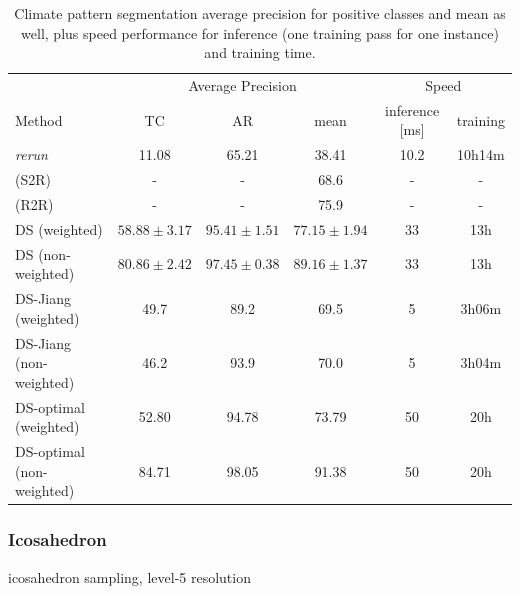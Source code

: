 \documentclass{article} %
\begin{document}
\begin{table}
\begin{tabular}{l|c c c c c}
        \multicolumn{1}{l}{} & \multicolumn{3}{c}{Average Precision} & \multicolumn{2}{c}{Speed}\\
        \cmidrule(lr){2-4}\cmidrule(lr){5-6}
        \multicolumn{1}{l}{Method} & TC & AR & mean & inference [ms] & training \\ \hline
        \cite{jiang_spherical_2019} \emph{rerun} & 11.08 & 65.21 & 38.41 & 10.2 & 10h14m\\
        \cite{cohen_gauge_2019} (S2R) & - & -& 68.6 & - & - \\
        \cite{cohen_gauge_2019} (R2R) & - & -& 75.9 & - & -\\ \hline
        DS (weighted) & $58.88\pm 3.17$ & $95.41\pm 1.51$ & $77.15\pm 1.94$ & 33 & 13h \\
        DS (non-weighted) & $80.86\pm 2.42$ & $97.45\pm 0.38$ & $89.16\pm 1.37$ & 33 & 13h \\ \hline
        DS-Jiang (weighted) & 49.7 & 89.2 & 69.5 & 5 & 3h06m\\
        DS-Jiang (non-weighted) & 46.2 & 93.9 & 70.0 & 5 & 3h04m \\ \hline
        DS-optimal (weighted) & 52.80 & 94.78 & 73.79 & 50 & 20h \\
        DS-optimal (non-weighted) & 84.71 & 98.05 & 91.38 & 50 & 20h \\ \hline
    \end{tabular}
    \caption{Climate pattern segmentation average precision for positive classes and mean as well, plus speed performance for inference (one training pass for one instance)  and training time.}
\end{table}

\subsubsection*{Icosahedron}

icosahedron sampling, level-5 resolution
\end{document}

